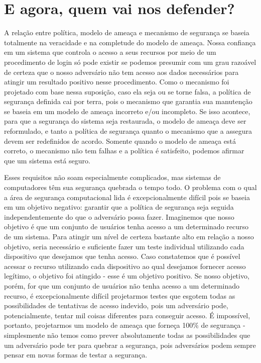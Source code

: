 \documentclass[
	10pt,				%
	openright,			%
	twoside,			%
	a5paper,			%
	english,			%
	french,				%
	spanish,			%
	brazil,				%
	sumario=tradicional
]{abntex2}
\begin{document}
\section{E agora, quem vai nos defender?}

A relação entre política, modelo de ameaça e mecanismo de segurança se baseia totalmente na veracidade e na completude do modelo de ameaça. Nossa confiança em um sistema que controla o acesso a seus recursos por meio de um procedimento de login só pode existir se podemos presumir com um grau razoável de certeza que o nosso adversário não tem acesso aos dados necessários para atingir um resultado positivo nesse procedimento. Como o mecanismo foi projetado com base nessa suposição, caso ela seja ou se torne falsa, a política de segurança definida cai por terra, pois o mecanismo que garantia sua manutenção se baseia em um modelo de ameaça incorreto e/ou incompleto. Se isso acontece, para que a segurança do sistema seja restaurada, o modelo de ameaça deve ser reformulado, e tanto a política de segurança quanto o mecanismo que a assegura devem ser redefinidos de acordo. Somente quando o modelo de ameaça está correto, o mecanismo não tem falhas e a política é satisfeito, podemos afirmar que um sistema está seguro. 

Esses requisitos não soam especialmente complicados, mas sistemas de computadores têm sua segurança quebrada o tempo todo. O problema com o qual a área de segurança computacional lida é excepcionalmente difícil pois se baseia em um objetivo negativo: garantir que a política de segurança seja seguida independentemente do que o adversário possa fazer. 	Imaginemos que nosso objetivo é que um conjunto de usuários tenha acesso a um determinado recurso de um sistema. Para atingir um nível de certeza bastante alto em relação a nosso objetivo, seria necessário e suficiente fazer um teste individual utilizando cada dispositivo que desejamos que tenha acesso. Caso constatemos que é possível acessar o recurso utilizando cada dispositivo ao qual desejamos fornecer acesso legítimo, o objetivo foi atingido - esse é um objetivo positivo. Se nosso objetivo, porém, for que um conjunto de usuários não tenha acesso a um determinado recurso, é excepcionalmente difícil projetarmos testes que esgotem todas as possibilidades de tentativas de acesso indevido, pois um adversário pode, potencialmente, tentar mil coisas diferentes para conseguir acesso. É impossível, portanto, projetarmos um modelo de ameaça que forneça 100\% de segurança - simplesmente não temos como prever absolutamente todas as possibilidades que um adversário pode ter para quebrar a segurança, pois adversários podem sempre pensar em novas formas de testar a segurança. 
\end{document}
